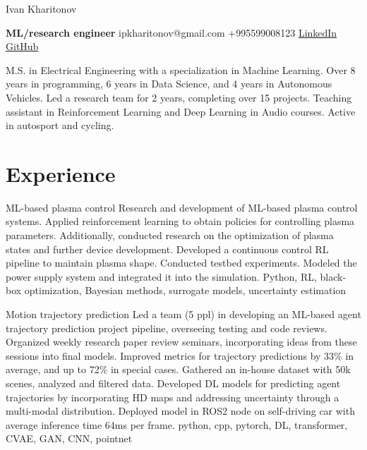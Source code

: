 \documentclass[]{resume}
\begin{document}
\begin{center}
	\Huge Ivan Kharitonov \par
	\normalsize  \textbf{ML/research engineer} \hfill ipkharitonov@gmail.com \hfill +995599008123 \hfill \href{https://www.linkedin.com/in/ivan-kharitonov-main/}{LinkedIn} \hfill \href{https://github.com/kharitonov-ivan}{GitHub}
\end{center}
\vspace{-1em}

\noindent M.S. in Electrical Engineering with a specialization in Machine Learning. Over 8 years in programming, 6 years in Data Science, and 4 years in Autonomous Vehicles. Led a research team for 2 years, completing over 15 projects. Teaching assistant in Reinforcement Learning and Deep Learning in Audio courses. Active in autosport and cycling.

\section*{\sectionformat Experience}
\project
{ML-based plasma control}
{Research and development of ML-based plasma control systems. Applied reinforcement learning to obtain policies for controlling plasma parameters. Additionally, conducted research on the optimization of plasma states and further device development.}
{Developed a continuous control RL pipeline to maintain plasma shape. Conducted testbed experiments. Modeled the power supply system and integrated it into the simulation.}
{Python, RL, black-box optimization, Bayesian methods, surrogate models, uncertainty estimation}

\project
{Motion trajectory prediction}
{Led a team (5 ppl) in developing an ML-based agent trajectory prediction project pipeline, overseeing testing and code reviews. Organized weekly research paper review seminars, incorporating ideas from these sessions into final models.}
{Improved metrics for trajectory predictions by 33\% in average, and up to 72\% in special cases. Gathered an in-house dataset with 50k scenes, analyzed and filtered data. Developed DL models for predicting agent trajectories by incorporating HD maps and addressing uncertainty through a multi-modal distribution. Deployed model in ROS2 node on self-driving car with average inference time 64ms per frame.}
{python, cpp, pytorch, DL, transformer, CVAE, GAN, CNN, pointnet}
\end{document}
